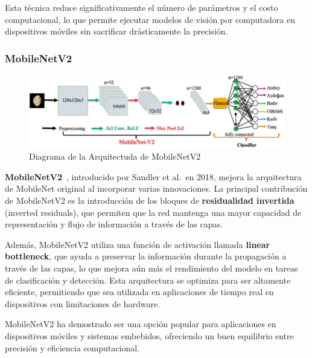 Esta técnica reduce significativamente el número de parámetros y el costo computacional, lo que permite ejecutar
modelos de visión por computadora en dispositivos móviles sin sacrificar drásticamente la precisión.

\subsubsection{MobileNetV2}\label{subsubsec:mobilenetv2}

\begin{figure}[htp] \label{fig:mobilenetv2}
    \begin{center}
        \includegraphics[width=1\textwidth]{imagenes/mobilenetv2.png}
    \end{center}
    \caption[MobileNetV2]{Diagrama de la Arquitectuda de MobileNetV2}
\end{figure}

\textbf{MobileNetV2}~\cite{sandlerMobileNetV2InvertedResiduals2019}, introducido por Sandler et al.\ en 2018, mejora la arquitectura
de MobileNet original al incorporar varias innovaciones.
La principal contribución de MobileNetV2 es la introducción de los bloques de \textbf{residualidad invertida} (inverted
residuals), que permiten que la red mantenga una mayor capacidad de representación y flujo de información a través de
las capas.


Además, MobileNetV2 utiliza una función de activación llamada \textbf{linear bottleneck}, que ayuda a preservar la
información durante la propagación a través de las capas, lo que mejora aún más el rendimiento del modelo en tareas de
clasificación y detección.
Esta arquitectura se optimiza para ser altamente eficiente, permitiendo que sea utilizada en aplicaciones de tiempo
real en dispositivos con limitaciones de hardware.


MobileNetV2 ha demostrado ser una opción popular para aplicaciones en dispositivos móviles y sistemas embebidos,
ofreciendo un buen equilibrio entre precisión y eficiencia computacional.
